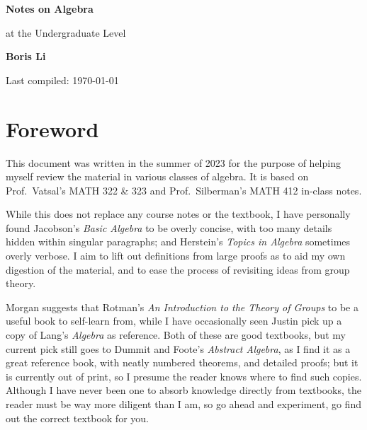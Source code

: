 \begin{titlepage}
\begin{center}
    \vspace*{1cm}
    {\Huge\textbf{Notes on Algebra}}

    \vspace{5mm}
    {\LARGE at the Undergraduate Level}

    \vspace{15mm}
    {\Large\textbf{Boris Li}}

    \vspace*{4cm}

    \vfill

    {\large Last compiled: \today}
\end{center}
\end{titlepage}

\section*{Foreword}

This document was written in the summer of 2023
for the purpose of helping myself review the material
in various classes of algebra.
It is based on Prof.\ Vatsal's MATH 322 \& 323
and Prof.\ Silberman's MATH 412 in-class notes.

While this does not replace any course notes or the textbook,
I have personally found Jacobson's \textit{Basic Algebra}
to be overly concise,
with too many details hidden within singular paragraphs;
and Herstein's \textit{Topics in Algebra} sometimes overly verbose.
I aim to lift out definitions from large proofs
as to aid my own digestion of the material,
and to ease the process of revisiting ideas from group theory.

Morgan suggests that Rotman's \textit{An Introduction to the Theory of Groups}
to be a useful book to self-learn from,
while I have occasionally seen Justin
pick up a copy of Lang's \textit{Algebra} as reference.
Both of these are good textbooks,
but my current pick still goes to Dummit and Foote's \textit{Abstract Algebra},
as I find it as a great reference book,
with neatly numbered theorems, and detailed proofs;
but it is currently out of print,
so I presume the reader knows where to find such copies.
Although I have never been one to absorb knowledge directly from textbooks,
the reader must be way more diligent than I am,
so go ahead and experiment,
go find out the correct textbook for you.

